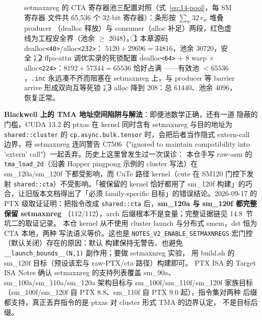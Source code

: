 \begin{figure}[H]
\caption{setmaxnreg 的 CTA 寄存器池三配置对照（式~\ref{eq:14-pool}，每 SM 寄存器
文件共 65{,}536 个 32-bit 寄存器）：条形按 $\sum_w 32\,r_w$ 堆叠 producer
（dealloc 释放）与 consumer（alloc 补足）两段，红色虚线为工程安全界（池余
$\ge$ 2048）。\textcircled{1} 本章源码 dealloc\texttt{<40>}/alloc\texttt{<232>}：
$5120+29696=34816$，池余 30720，安全；\textcircled{2} ffpa-attn 调优实录的死锁配置
dealloc\texttt{<64>} $+$ 8 warp $\times$ alloc\texttt{<224>}：$8192+57344=65536$ 恰好占满
——有效池 $<65536$，\texttt{.inc} 永远凑不齐而阻塞在 setmaxnreg 上，与 producer 等
barrier arrive 形成双向互等死锁；\textcircled{3} alloc 降到 208：总 61440、池余
4096，恢复正常。}
\label{fig:14-regpool}
\end{figure}

\textbf{Blackwell 上的 TMA 地址空间陷阱与解法}：即便池数学正确，还有一道
隐蔽的门槛，CUDA 13.2 的 ptxas 在 kernel 同时含有 setmaxnreg 与目的地址为
\texttt{shared::cluster} 的 \texttt{cp.\allowbreak{}async.\allowbreak{}bulk.\allowbreak{}tensor} 时，会把后者当作隐式
extern-call 边界，将 setmaxnreg 连同警告 C7506（"ignored to maintain
compatibility into 'extern' call"）一起丢弃。历史上这里曾发生过一次误诊：
本仓手写 raw-asm 的 \texttt{tma\_\allowbreak{}load\_\allowbreak{}2d}（沿袭 Hopper
pingpong 示例的 cluster 写法）在 sm\_120a/sm\_120f 下都受影响，而 CuTe 路径
kernel（cute 在 SM120 门控下发射 \texttt{shared::cta}）不受影响。「被保留的 kernel
恰好都用了 sm\_120f 构建」的巧合，让旧版本文档得出了「必须 family-specific
目标」的错误结论。2026-09-17 的 PTX 级取证证明：把指令改成
\texttt{shared::cta} 后，\textbf{sm\_120a 与 sm\_120f 都完整保留 setmaxnreg}
（112/112），arch 后缀根本不是变量；完整证据链见 14.8~节坑二的取证记录。
本仓 kernel 从不使用 cluster launch 与分布式 smem，dst 恒为 CTA 本地，两种
写法语义等价。这也是
\texttt{NOTES\_\allowbreak{}V2\_\allowbreak{}ENABLE\_\allowbreak{}SETMAXNREGS} 宏门控（默认关闭）存在的原因：默认
构建保持无警告、也避免
\texttt{\_\allowbreak{}\_\allowbreak{}launch\_\allowbreak{}bounds\_\allowbreak{}\_\allowbreak{}(N,\allowbreak{}1)} 副作用；要做 setmaxnreg 实验，
用 build.sh 的 sm\_120f 目标（预设该宏与 raw-PTX/cta 路径）构建即可。
PTX ISA 的 Target ISA Notes 确认 setmaxnreg 的支持列表覆盖 sm\_90a、
sm\_100a/sm\_110a/sm\_120a 架构目标与 sm\_100f/sm\_110f/sm\_120f 家族目标
（sm\_100f/sm\_120f 自 PTX 8.8、sm\_110f 自 PTX 9.0 起），指令集对两种
后缀都支持，真正丢弃指令的是 ptxas 对 cluster 形式 TMA 的边界认定，
不是目标后缀。

